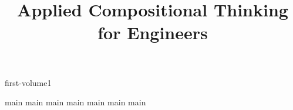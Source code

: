 \pagestyle{scrheadings}

\ohead{\pagemark}
\ihead{\headmark}
\cfoot{}
\dominitoc
\doparttoc
\setcounter{parttocdepth}{0}
\setcounter{minitocdepth}{1}

\title{Applied Compositional Thinking\\ for Engineers}
\date{}



{first-volume1}


\setcounter{tocdepth}{1}





\tableofcontents

\devel{

}




{main}
{main}
{main}
{main}
{main}
{main}
{main}

